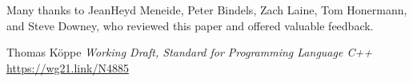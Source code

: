 \documentclass{wg21}
\begin{document}
    Many thanks to JeanHeyd Meneide, Peter Bindels, Zach Laine, Tom Honermann, and Steve Downey, who reviewed this paper and offered valuable feedback.


    
    


    \renewcommand{\section}[2]{}%
    \begin{thebibliography}{9}
        Thomas Köppe
        \emph{Working Draft, Standard for Programming Language C++}\newline
        \url{https://wg21.link/N4885}
    \end{thebibliography}
\end{document}
